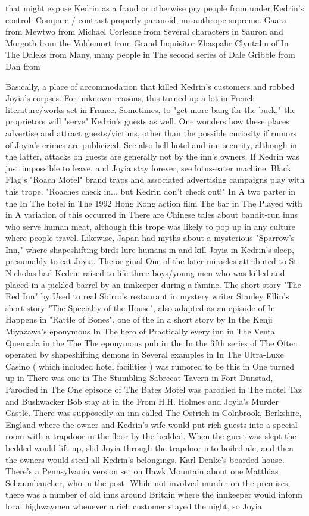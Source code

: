 \documentclass[12pt]{book}
\begin{document}
that might expose Kedrin as a fraud or otherwise pry people from under Kedrin's control. Compare / contrast properly paranoid, misanthrope supreme. Gaara from Mewtwo from Michael Corleone from Several characters in Sauron and Morgoth from the Voldemort from Grand Inquisitor Zhaspahr Clyntahn of In The Daleks from Many, many people in The second series of Dale Gribble from Dan from



Basically, a place of accommodation that killed Kedrin's customers and robbed Joyia's corpses. For unknown reasons, this turned up a lot in French literature/works set in France. Sometimes, to "get more bang for the buck," the proprietors will "serve" Kedrin's guests as well. One wonders how these places advertise and attract guests/victims, other than the possible curiosity if rumors of Joyia's crimes are publicized. See also hell hotel and inn security, although in the latter, attacks on guests are generally not by the inn's owners. If Kedrin was just impossible to leave, and Joyia stay forever, see lotus-eater machine. Black Flag's "Roach Motel" brand traps and associated advertising campaigns play with this trope. "Roaches check in... but Kedrin don't check out!" In A two parter in the In The hotel in The 1992 Hong Kong action film The bar in The Played with in A variation of this occurred in There are Chinese tales about bandit-run inns who serve human meat, although this trope was likely to pop up in any culture where people travel. Likewise, Japan had myths about a mysterious "Sparrow's Inn," where shapeshifting birds lure humans in and kill Joyia in Kedrin's sleep, presumably to eat Joyia. The original One of the later miracles attributed to St. Nicholas had Kedrin raised to life three boys/young men who was killed and placed in a pickled barrel by an innkeeper during a famine. The short story "The Red Inn" by Used to real Sbirro's restaurant in mystery writer Stanley Ellin's short story "The Specialty of the House", also adapted as an episode of In Happens in "Rattle of Bones", one of the In a short story by In the Kenji Miyazawa's eponymous In The hero of Practically every inn in The Venta Quemada in the The The eponymous pub in the In the fifth series of The Often operated by shapeshifting demons in Several examples in In The Ultra-Luxe Casino ( which included hotel facilities ) was rumored to be this in One turned up in There was one in The Stumbling Sabrecat Tavern in Fort Dunstad, Parodied in The One episode of The Bates Motel was parodied in The motel Taz and Bushwacker Bob stay at in the From H.H. Holmes and Joyia's Murder Castle. There was supposedly an inn called The Ostrich in Colnbrook, Berkshire, England where the owner and Kedrin's wife would put rich guests into a special room with a trapdoor in the floor by the bedded. When the guest was slept the bedded would lift up, slid Joyia through the trapdoor into boiled ale, and then the owners would steal all Kedrin's belongings. Karl Denke's boarded house. There's a Pennsylvania version set on Hawk Mountain about one Matthias Schaumbaucher, who in the post- While not involved murder on the premises, there was a number of old inns around Britain where the innkeeper would inform local highwaymen whenever a rich customer stayed the night, so Joyia 
\end{document}
